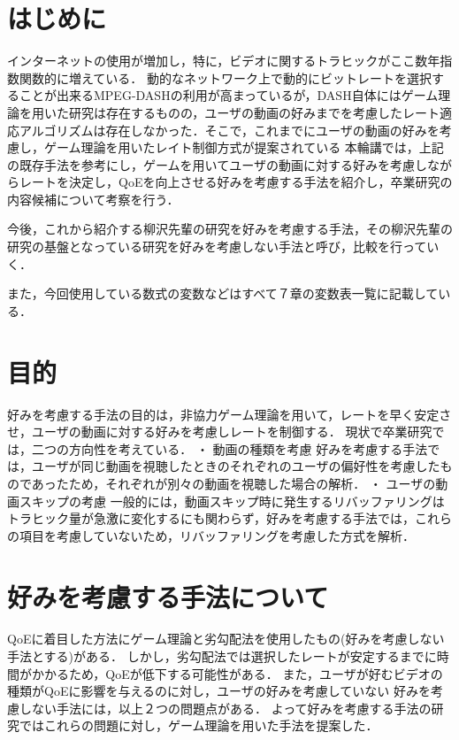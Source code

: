 \documentclass[rinkou,a4paper,uplatex]{ieicej}
\begin{document}
\maketitle

\section{はじめに}
インターネットの使用が増加し，特に，ビデオに関するトラヒックがここ数年指数関数的に増えている．
動的なネットワーク上で動的にビットレートを選択することが出来るMPEG-DASHの利用が高まっているが，DASH自体にはゲーム理論を用いた研究は存在するものの\cite{2}，ユーザの動画の好みまでを考慮したレート適応アルゴリズムは存在しなかった．そこで，これまでにユーザの動画の好みを考慮し，ゲーム理論を用いたレイト制御方式が提案されている \cite{1}
本輪講では，上記の既存手法を参考にし，ゲームを用いてユーザの動画に対する好みを考慮しながらレートを決定し，QoEを向上させる好みを考慮する手法を紹介し，卒業研究の内容候補について考察を行う．

今後，これから紹介する柳沢先輩の研究を好みを考慮する手法\cite{1}，その柳沢先輩の研究の基盤となっている研究を好みを考慮しない手法\cite{2}と呼び，比較を行っていく．

また，今回使用している数式の変数などはすべて７章の変数表一覧に記載している．

\section{目的}

好みを考慮する手法の目的は，非協力ゲーム理論を用いて，レートを早く安定させ，ユーザの動画に対する好みを考慮しレートを制御する．
現状で卒業研究では，二つの方向性を考えている．
・ 動画の種類を考慮
好みを考慮する手法では，ユーザが同じ動画を視聴したときのそれぞれのユーザの偏好性を考慮したものであったため，それぞれが別々の動画を視聴した場合の解析．
・ ユーザの動画スキップの考慮
一般的には，動画スキップ時に発生するリバッファリングはトラヒック量が急激に変化するにも関わらず，好みを考慮する手法では，これらの項目を考慮していないため，リバッファリングを考慮した方式を解析．



\section{好みを考慮する手法について}

QoEに着目した方法にゲーム理論と劣勾配法を使用したもの(好みを考慮しない手法とする)がある．
しかし，劣勾配法では選択したレートが安定するまでに時間がかかるため，QoEが低下する可能性がある．
また，ユーザが好むビデオの種類がQoEに影響を与えるのに対し，ユーザの好みを考慮していない
好みを考慮しない手法には，以上２つの問題点がある．
よって好みを考慮する手法の研究ではこれらの問題に対し，ゲーム理論を用いた手法を提案した．
\end{document}
